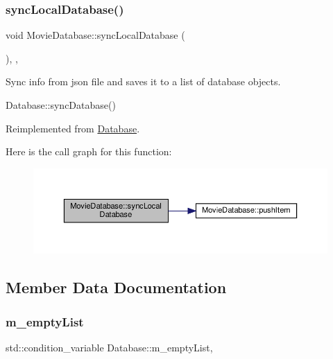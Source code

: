 \subsubsection{\texorpdfstring{sync\+Local\+Database()}{syncLocalDatabase()}}
{\footnotesize\ttfamily void Movie\+Database\+::sync\+Local\+Database (\begin{DoxyParamCaption}{ }\end{DoxyParamCaption})\hspace{0.3cm}{\ttfamily [inline]}, {\ttfamily [override]}, {\ttfamily [virtual]}}



Sync info from json file and saves it to a list of database objects. 

Database\+::sync\+Database() 

Reimplemented from \hyperlink{classDatabase_a14d24487b4ea3b50097b9ac0f2b3f317}{Database}.

Here is the call graph for this function\+:\nopagebreak
\begin{figure}[H]
\begin{center}
\leavevmode
\includegraphics[width=350pt]{classMovieDatabase_aee175db6a2a357b6180fcab5d57eddd5_cgraph}
\end{center}
\end{figure}


\subsection{Member Data Documentation}
\mbox{\label{classDatabase_a2ad8bf38964b3e18a0e168437acbdb27}} 
\subsubsection{\texorpdfstring{m\+\_\+empty\+List}{m\_emptyList}}
{\footnotesize\ttfamily std\+::condition\+\_\+variable Database\+::m\+\_\+empty\+List\hspace{0.3cm}{\ttfamily [protected]}, {\ttfamily [inherited]}}



